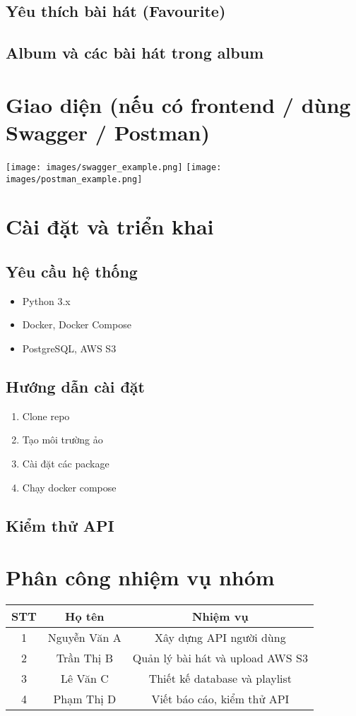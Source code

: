 \documentclass[12pt,a4paper]{report}
\begin{document}
\section{Yêu thích bài hát (Favourite)}
\section{Album và các bài hát trong album}

\chapter{Giao diện (nếu có frontend / dùng Swagger / Postman)}
\texttt{[image: images/swagger\_example.png]}
\texttt{[image: images/postman\_example.png]}

\chapter{Cài đặt và triển khai}
\section{Yêu cầu hệ thống}
\begin{itemize}
    \item Python 3.x
    \item Docker, Docker Compose
    \item PostgreSQL, AWS S3
\end{itemize}
\section{Hướng dẫn cài đặt}
\begin{enumerate}
    \item Clone repo
    \item Tạo môi trường ảo
    \item Cài đặt các package
    \item Chạy docker compose
\end{enumerate}
\section{Kiểm thử API}

\chapter{Phân công nhiệm vụ nhóm}
\begin{tabular}{|c|c|c|}
\hline
STT & Họ tên & Nhiệm vụ \\
\hline
1 & Nguyễn Văn A & Xây dựng API người dùng \\
2 & Trần Thị B & Quản lý bài hát và upload AWS S3 \\
3 & Lê Văn C & Thiết kế database và playlist \\
4 & Phạm Thị D & Viết báo cáo, kiểm thử API \\
\hline
\end{tabular}
\end{document}
